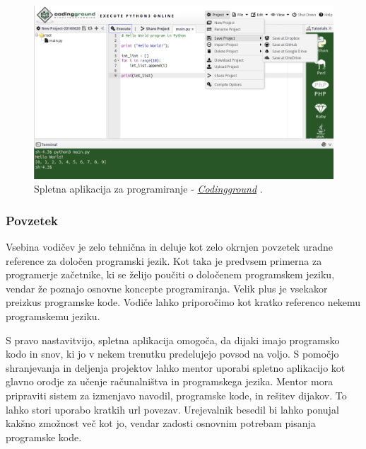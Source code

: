 \begin{figure}[h!]
  \centering
    \includegraphics [width=0.65\linewidth, keepaspectratio =
   1] {./images/sc_web/tutpoint_cg-v01.png}
   \caption{Spletna aplikacija za programiranje -
     \emph{\href{http://www.tutorialspoint.com/codingground.htm}{Codingground}}
     \cite{web:tutorialspoint:codingground}.}
    \label{fig:web:tutpoint:cg}
\end{figure}

\subsubsection{Povzetek}
\label{sec:povzetek_tutpoint}

Vsebina vodičev je zelo tehnična in deluje kot zelo okrnjen povzetek
uradne reference za določen programski jezik. Kot taka je predvsem
primerna za programerje začetnike, ki se želijo poučiti o določenem
programskem jeziku, vendar že poznajo osnovne koncepte
programiranja. Velik plus je vsekakor preizkus programske
kode. Vodiče lahko priporočimo kot kratko referenco nekemu
programskemu jeziku.

S pravo nastavitvijo, spletna aplikacija omogoča, da dijaki imajo
programsko kodo in snov, ki jo v nekem trenutku predelujejo povsod na
voljo. S pomočjo shranjevanja in deljenja projektov lahko mentor
uporabi spletno aplikacijo kot glavno orodje za učenje računalništva
in programskega jezika. Mentor mora pripraviti sistem za izmenjavo
navodil, programske kode, in rešitev dijakov. To lahko stori uporabo
kratkih url povezav. Urejevalnik besedil bi lahko ponujal kakšno
zmožnost več kot jo, vendar zadosti osnovnim potrebam pisanja
programske kode.


